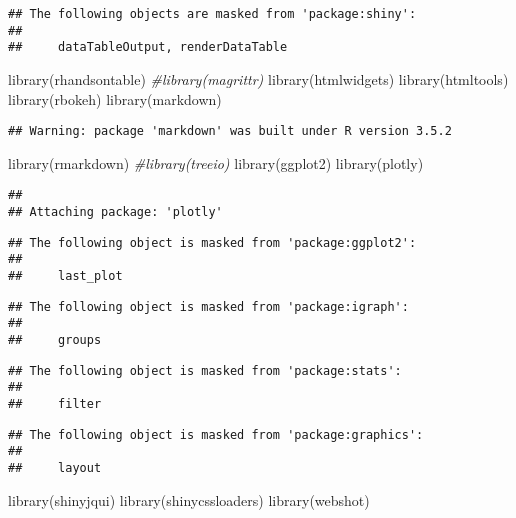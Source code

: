 \documentclass[
]{article}
\newenvironment{Shaded}{\begin{snugshade}}{\end{snugshade}}
\newcommand{\CommentTok}[1]{\textcolor[rgb]{0.56,0.35,0.01}{\textit{#1}}}
\newcommand{\FunctionTok}[1]{\textcolor[rgb]{0.00,0.00,0.00}{#1}}
\newcommand{\NormalTok}[1]{#1}
\begin{document}
\begin{verbatim}
## The following objects are masked from 'package:shiny':
## 
##     dataTableOutput, renderDataTable
\end{verbatim}

\begin{Shaded}
\begin{Highlighting}[]
\FunctionTok{library}\NormalTok{(rhandsontable)}
\CommentTok{\#library(magrittr)}
\FunctionTok{library}\NormalTok{(htmlwidgets)}
\FunctionTok{library}\NormalTok{(htmltools)}
\FunctionTok{library}\NormalTok{(rbokeh)}
\FunctionTok{library}\NormalTok{(markdown)}
\end{Highlighting}
\end{Shaded}

\begin{verbatim}
## Warning: package 'markdown' was built under R version 3.5.2
\end{verbatim}

\begin{Shaded}
\begin{Highlighting}[]
\FunctionTok{library}\NormalTok{(rmarkdown)}
\CommentTok{\#library(treeio)}
\FunctionTok{library}\NormalTok{(ggplot2)}
\FunctionTok{library}\NormalTok{(plotly)}
\end{Highlighting}
\end{Shaded}

\begin{verbatim}
## 
## Attaching package: 'plotly'
\end{verbatim}

\begin{verbatim}
## The following object is masked from 'package:ggplot2':
## 
##     last_plot
\end{verbatim}

\begin{verbatim}
## The following object is masked from 'package:igraph':
## 
##     groups
\end{verbatim}

\begin{verbatim}
## The following object is masked from 'package:stats':
## 
##     filter
\end{verbatim}

\begin{verbatim}
## The following object is masked from 'package:graphics':
## 
##     layout
\end{verbatim}

\begin{Shaded}
\begin{Highlighting}[]
\FunctionTok{library}\NormalTok{(shinyjqui)}
\FunctionTok{library}\NormalTok{(shinycssloaders)}
\FunctionTok{library}\NormalTok{(webshot)}
\end{Highlighting}
\end{Shaded}
\end{document}
